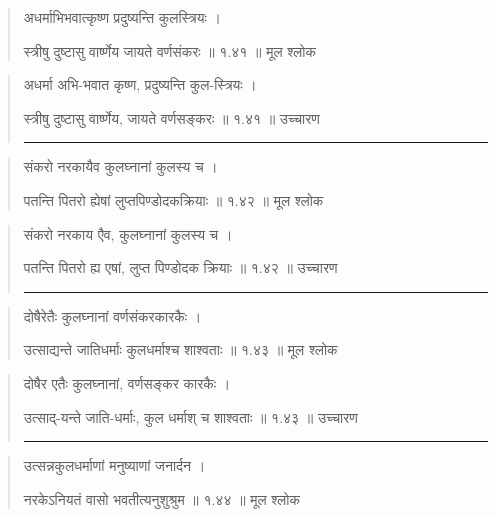 \begin{quotation} 

अधर्माभिभवात्कृष्ण प्रदुष्यन्ति कुलस्त्रियः  ।  


स्त्रीषु दुष्टासु वार्ष्णेय जायते वर्णसंकरः  ॥ १.४१ ॥  मूल श्लोक
\end{quotation}

\begin{quotation}

अधर्मा अभि-भवात कृष्ण, प्रदुष्यन्ति कुल-स्त्रियः  ।  


स्त्रीषु दुष्टासु वार्ष्णेय, जायते वर्णसङ्करः  ॥ १.४१ ॥  उच्चारण

\noindent\rule{16cm}{0.4pt} 
\end{quotation}


\begin{quotation} 

संकरो नरकायैव कुलघ्नानां कुलस्य च  ।  


पतन्ति पितरो ह्येषां लुप्तपिण्डोदकक्रियाः  ॥ १.४२ ॥  मूल श्लोक
\end{quotation}

\begin{quotation}

संकरो नरकाय एैव, कुलघ्नानां कुलस्य च  ।  


पतन्ति पितरो ह्य एषां, लुप्त पिण्डोदक क्रियाः  ॥ १.४२ ॥  उच्चारण

\noindent\rule{16cm}{0.4pt} 
\end{quotation}


\begin{quotation} 

दोषैरेतैः कुलघ्नानां वर्णसंकरकारकैः  ।  


उत्साद्यन्ते जातिधर्माः कुलधर्माश्च शाश्वताः  ॥ १.४३ ॥  मूल श्लोक
\end{quotation}

\begin{quotation}

दोषैर एतैः कुलघ्नानां, वर्णसङ्कर कारकैः  ।  


उत्साद्-यन्ते जाति-धर्माः, कुल धर्माश् च शाश्वताः  ॥ १.४३ ॥  उच्चारण

\noindent\rule{16cm}{0.4pt} 
\end{quotation}


\begin{quotation} 

उत्सन्नकुलधर्माणां मनुष्याणां जनार्दन  ।  


नरकेऽनियतं वासो भवतीत्यनुशुश्रुम  ॥ १.४४ ॥  मूल श्लोक
\end{quotation}


